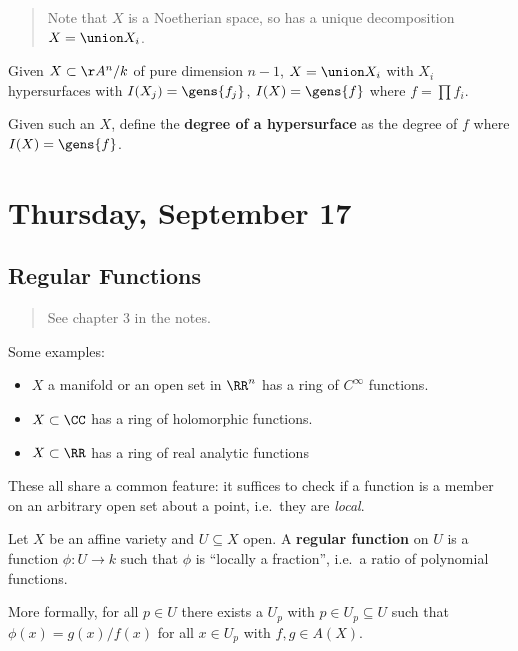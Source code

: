 \begin{quote}
Note that \(X\) is a Noetherian space, so has a unique decomposition
\(X = \union X_i\).
\end{quote}

Given \(X\subset \AA^n/k\) of pure dimension \(n-1\), \(X = \union X_i\)
with \(X_i\) hypersurfaces with \(I(X_j) = \gens{f_j}\),
\(I(X) = \gens{f}\) where \(f = \prod f_i\).

\begin{definition}[?]

Given such an \(X\), define the \textbf{degree of a hypersurface} as the
degree of \(f\) where \(I(X) = \gens{f}\).

\end{definition}

\hypertarget{thursday-september-17}{%
\section{Thursday, September 17}\label{thursday-september-17}}

\hypertarget{regular-functions}{%
\subsection{Regular Functions}\label{regular-functions}}

\begin{quote}
See chapter 3 in the notes.
\end{quote}

Some examples:

\begin{itemize}
\tightlist
\item
  \(X\) a manifold or an open set in \(\RR^n\) has a ring of
  \(C^\infty\) functions.
\item
  \(X \subset \CC\) has a ring of holomorphic functions.
\item
  \(X\subset \RR\) has a ring of real analytic functions
\end{itemize}

These all share a common feature: it suffices to check if a function is
a member on an arbitrary open set about a point, i.e.~they are
\emph{local}.

\begin{definition}[?]

Let \(X\) be an affine variety and \(U\subseteq X\) open. A
\textbf{regular function} on \(U\) is a function \(\phi: U\to k\) such
that \(\phi\) is ``locally a fraction'', i.e.~a ratio of polynomial
functions.

More formally, for all \(p\in U\) there exists a \(U_p\) with
\(p\in U_p \subseteq U\) such that \(\phi(x) = g(x)/ f(x)\) for all
\(x\in U_p\) with \(f, g\in A(X)\).

\end{definition}

